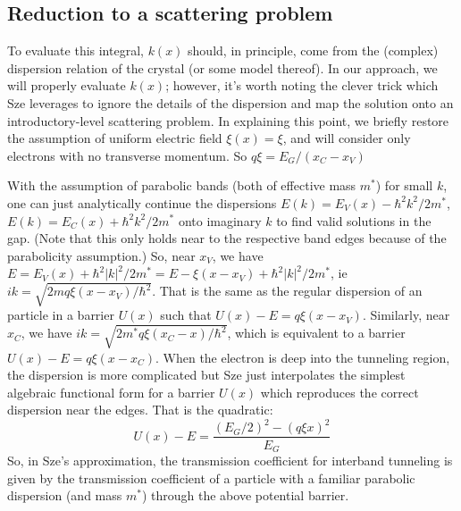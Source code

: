 \subsection{Reduction to a scattering problem}
To evaluate this integral, $k(x)$ should, in principle, come from the (complex) dispersion relation of the crystal (or some model thereof).  In our approach, we will properly evaluate $k(x)$; however, it's worth noting the clever trick which Sze leverages to ignore the details of the dispersion and map the solution onto an introductory-level scattering problem.  In explaining this point, we briefly restore the assumption of uniform electric field $\xi(x)=\xi$, and will consider only electrons with no transverse momentum.  So $q\xi=E_G/(x_C-x_V)$

With the assumption of parabolic bands (both of effective mass $m^*$) for small $k$, one can just analytically continue the dispersions $E(k)=E_V(x)-\hbar^2k^2/2m^*$, $E(k)=E_C(x)+\hbar^2k^2/2m^*$ onto imaginary $k$ to find valid solutions in the gap.  (Note that this only holds near to the respective band edges because of the parabolicity assumption.)  So, near $x_V$, we have $E=E_V(x)+\hbar^2|k|^2/2m^*=E-\xi(x-x_V)+\hbar^2|k|^2/2m^*$, ie $ik=\sqrt{2mq\xi(x-x_V)/\hbar^2}$.  That is the same as the regular dispersion of an particle in a barrier $U(x)$ such that $U(x)-E=q\xi(x-x_V)$.  Similarly, near $x_C$, we have $ik=\sqrt{2m^*q\xi(x_C-x)/\hbar^2}$, which is equivalent to a barrier $U(x)-E=q\xi(x-x_C)$.  When the electron is deep into the tunneling region, the dispersion is more complicated but Sze just interpolates the simplest algebraic functional form for a barrier $U(x)$ which reproduces the correct dispersion near the edges.  That is the quadratic:
$$U(x)-E=\frac{(E_G/2)^2-(q\xi x)^2}{E_G}$$
So, in Sze's approximation, the transmission coefficient for interband tunneling is given by the transmission coefficient of a particle with a familiar parabolic dispersion (and mass $m^*$) through the above potential barrier.
